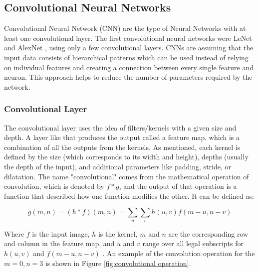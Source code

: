 \subsection{Convolutional Neural Networks}

Convolutional Neural Network (CNN) \cite{lecun1995convolutional, lecun1989backpropagation} are the type of Neural Networks with at least one convolutional layer. The first convolutional neural networks were LeNet \cite{cnnLecun1998} and AlexNet \cite{krizhevsky2012imagenet}, using only a few convolutional layers. CNNs are assuming that the input data consists of hierarchical patterns which can be used instead of relying on individual features and creating a connection between every single feature and neuron. This approach helps to reduce the number of parameters required by the network.

\subsubsection*{Convolutional Layer}

The convolutional layer uses the idea of filters/kernels with a given size and depth. A layer like that produces the output called a feature map, which is a combination of all the outputs from the kernels. As mentioned, each kernel is defined by the size (which corresponds to its width and height), depths (usually the depth of the input), and additional parameters like padding, stride, or dilatation. The name "convolutional" comes from the mathematical operation of convolution, which is denoted by $f*g$, and the output of that operation is a function that described how one function modifies the other. It can be defined as:

\begin{equation}
    g(m,n) = (h*f)(m,n) = \sum_{u} \sum_{v} h(u,v)f(m-u,n-v)
\end{equation}

Where $f$ is the input image, $h$ is the kernel, $m$ and $n$ are the corresponding row and column in the feature map, and $u$ and $v$ range over all legal subscripts for $h(u,v)$ and $f(m-u,n-v)$ \cite{keller2010convolutions}. An example of the convolution operation for the $m=0, n=3$ is shown in Figure \ref{fig:convolutional operation}.

